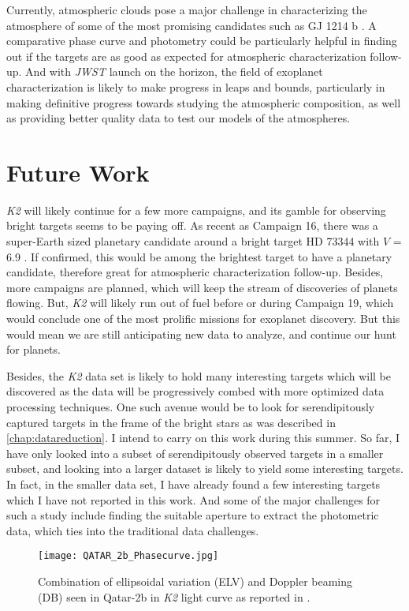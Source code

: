 Currently, atmospheric clouds pose a major challenge in characterizing the atmosphere of some of the most promising candidates such as GJ 1214 b \citep{kreidberg2014}. A comparative phase curve and photometry could be particularly helpful in finding out if the targets are as good as expected for atmospheric characterization follow-up. And with \textit{JWST} launch on the horizon, the field of exoplanet characterization is likely to make progress in leaps and bounds, particularly in making definitive progress towards studying the atmospheric composition, as well as providing better quality data to test our models of the atmospheres.

\section{Future Work}
\textit{K2} will likely continue for a few more campaigns, and its gamble for observing bright targets seems to be paying off. As recent as Campaign 16, there was a super-Earth sized planetary candidate around a bright target HD 73344 with $V$ = 6.9 \citep{yu2018}. If confirmed, this would be among the brightest target to have a planetary candidate, therefore great for atmospheric characterization follow-up. Besides, more campaigns are planned, which will keep the stream of discoveries of planets flowing. But, \textit{K2} will likely run out of fuel before or during Campaign 19, which would conclude one of the most prolific missions for exoplanet discovery. But this would mean we are still anticipating new data to analyze, and continue our hunt for planets.

Besides, the \textit{K2} data set is likely to hold many interesting targets which will be discovered as the data will be progressively combed with more optimized data processing techniques. One such avenue would be to look for serendipitously captured targets in the frame of the bright stars as was described in \autoref{chap:datareduction}. I intend to carry on this work during this summer. So far, I have only looked into a subset of serendipitously observed targets in a smaller subset, and looking into a larger dataset is likely to yield some interesting targets. In fact, in the smaller data set, I have already found a few interesting targets which I have not reported in this work. And some of the major challenges for such a study include finding the suitable aperture to extract the photometric data, which ties into the traditional data challenges.

\begin{figure}[b!]
\centering
\texttt{[image: QATAR\_2b\_Phasecurve.jpg]}
\caption{\label{fig:qatarphasecurve} Combination of ellipsoidal variation (ELV) and Doppler beaming (DB) seen in Qatar-2b in \textit{K2} light curve as reported in \citet{dai2017_qatar}.}
\end{figure}

